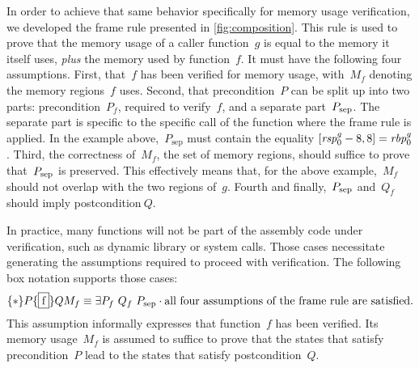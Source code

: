 In order to achieve that same behavior specifically for memory usage verification,%
we developed the frame rule presented in \cref{fig:composition}.
This rule is used to prove that the memory usage of a caller function~$g$
is equal to the memory it itself uses, \emph{plus} the memory used by function~$f$.
It must have the following four assumptions.
First, that~$f$ has been verified for memory usage,
with~$M_f$ denoting the memory regions~$f$ uses.%
Second, that precondition~$P$ can be split up into two parts:%
precondition~$P_f$, required to verify~$f$, and a separate part~$\psep$.
The separate part is specific to the specific call of the function
where the frame rule is applied.%
In the example above,~$P_\mathrm{sep}$ must contain the equality
$\region{\rspo^g-8}{8}=\rbpo^g$.
Third, the correctness of~$M_f$, the set of memory regions,
should suffice to prove that~$\psep$ is preserved.
This effectively means that, for the above example,~$M_f$
should not overlap with the two regions of~$g$.
Fourth and finally,~$\psep$ and~$Q_f$ should imply postcondition$~Q$.
\begin{figure*}
  \begin{prooftree}
  \end{prooftree}
  \caption{Frame rule for composition of memory usage}\label{fig:composition}
\end{figure*}

In practice, many functions will not be part of the assembly code under verification, such as dynamic library or system calls.
Those cases necessitate generating the assumptions required
to proceed with verification.
The following box notation supports those cases:
\begin{equation}
  \htriple*P{\fbox f}Q{M_f}\equiv
  \exists P_f~Q_f~\psep\cdot
  \text{all four assumptions of the frame rule are satisfied}.
\end{equation}
This assumption informally expresses that function~$f$ has been verified.
Its memory usage~$M_f$ is assumed to suffice to prove that
the states that satisfy precondition~$P$ lead to the states that satisfy%
postcondition~$Q$.%

